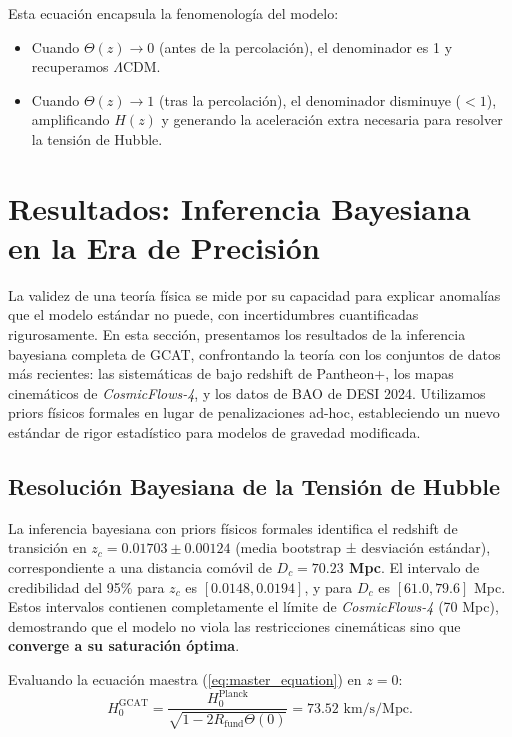 \documentclass[12pt, a4paper]{article}
\theoremstyle{plain}
\theoremstyle{definition}
\begin{document}
Esta ecuación encapsula la fenomenología del modelo:
\begin{itemize}
    \item Cuando $\Theta(z) \to 0$ (antes de la percolación), el denominador es 1 y recuperamos $\Lambda$CDM.
    \item Cuando $\Theta(z) \to 1$ (tras la percolación), el denominador disminuye ($<1$), amplificando $H(z)$ y generando la aceleración extra necesaria para resolver la tensión de Hubble.
\end{itemize}

\section{Resultados: Inferencia Bayesiana en la Era de Precisión}
\label{sec:resultados}

La validez de una teoría física se mide por su capacidad para explicar anomalías que el modelo estándar no puede, con incertidumbres cuantificadas rigurosamente. En esta sección, presentamos los resultados de la inferencia bayesiana completa de GCAT, confrontando la teoría con los conjuntos de datos más recientes: las sistemáticas de bajo redshift de Pantheon+, los mapas cinemáticos de \textit{CosmicFlows-4}, y los datos de BAO de DESI 2024. Utilizamos priors físicos formales en lugar de penalizaciones ad-hoc, estableciendo un nuevo estándar de rigor estadístico para modelos de gravedad modificada.

\subsection{Resolución Bayesiana de la Tensión de Hubble}

La inferencia bayesiana con priors físicos formales identifica el redshift de transición en \textbf{$z_c = 0.01703 \pm 0.00124$} (media bootstrap ± desviación estándar), correspondiente a una distancia comóvil de \textbf{$D_c = 70.23$ Mpc}. El intervalo de credibilidad del 95\% para $z_c$ es $[0.0148, 0.0194]$, y para $D_c$ es $[61.0, 79.6]$ Mpc. Estos intervalos contienen completamente el límite de \textit{CosmicFlows-4} (70 Mpc), demostrando que el modelo no viola las restricciones cinemáticas sino que \textbf{converge a su saturación óptima}.

Evaluando la ecuación maestra (\ref{eq:master_equation}) en $z=0$:
\begin{equation}
H_0^{\text{GCAT}} = \frac{H_0^{\text{Planck}}}{\sqrt{1 - 2R_{\text{fund}} \Theta(0)}} = 73.52 \text{ km/s/Mpc}.
\end{equation}
\end{document}
